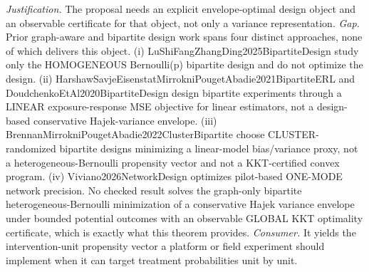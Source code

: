 \documentclass{article}
\begin{document}
\par\smallskip\noindent \textit{Justification.} The proposal needs an explicit envelope-optimal design object and an observable certificate for that object, not only a variance representation. \textit{Gap.} Prior graph-aware and bipartite design work spans four distinct approaches, none of which delivers this object. (i) LuShiFangZhangDing2025BipartiteDesign study only the HOMOGENEOUS Bernoulli(p) bipartite design and do not optimize the design. (ii) HarshawSavjeEisenstatMirrokniPougetAbadie2021BipartiteERL and DoudchenkoEtAl2020BipartiteDesign design bipartite experiments through a LINEAR exposure-response MSE objective for linear estimators, not a design-based conservative Hajek-variance envelope. (iii) BrennanMirrokniPougetAbadie2022ClusterBipartite choose CLUSTER-randomized bipartite designs minimizing a linear-model bias/variance proxy, not a heterogeneous-Bernoulli propensity vector and not a KKT-certified convex program. (iv) Viviano2026NetworkDesign optimizes pilot-based ONE-MODE network precision. No checked result solves the graph-only bipartite heterogeneous-Bernoulli minimization of a conservative Hajek variance envelope under bounded potential outcomes with an observable GLOBAL KKT optimality certificate, which is exactly what this theorem provides. \textit{Consumer.} It yields the intervention-unit propensity vector a platform or field experiment should implement when it can target treatment probabilities unit by unit.
\end{document}
